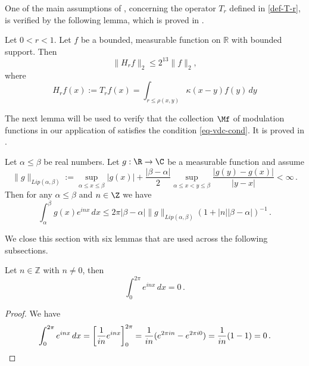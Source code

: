 One of the main assumptions of , concerning the operator $T_r$ defined in \eqref{def-T-r}, is verified by the following lemma, which is proved in .
\begin{lemma}
    \label{Hilbert-strong-2-2}
    \leanok
    Let $0<r<1$. Let $f$ be a bounded, measurable function on $\mathbb{R}$ with bounded support. Then
    \begin{equation}
        \label{eq-Hr-L2-bound}
        \|H_rf\|_{2}\leq 2^{13} \|f\|_2,
    \end{equation}
    where
    \begin{equation}
        \label{def-H-r}
        H_r f(x) := T_r f(x) = \int_{r\le\rho(x,y)} \kappa(x-y) f(y) \, dy
    \end{equation}
\end{lemma}

The next lemma will be used to verify that the collection $\Mf$ of modulation functions in our application of  satisfies the condition \eqref{eq-vdc-cond}.
It is proved in .

\begin{lemma}
\label{van-der-Corput}
\leanok
{}
    Let $\alpha\le\beta$ be real numbers. Let $g:\R\to \C$ be a measurable function and assume
    \begin{equation}
        \|g\|_{Lip(\alpha,\beta)}:=\sup_{\alpha\le x\le \beta}|g(x)|+\frac{|\beta-\alpha|}{2}
        \sup_{\alpha\le x<y\le \beta} \frac {|g(y)-g(x)|}{|y-x|}<\infty\, .
    \end{equation}
    Then for any $\alpha \le \beta$ and $n\in\Z$ we have
    \begin{equation}
        \int _{\alpha}^{\beta} g(x) e^{inx}\, dx\le 2\pi |\beta-\alpha|\|g\|_{Lip(\alpha,\beta)}(1+|n||\beta-\alpha|)^{-1}\, .
    \end{equation}

\end{lemma}


We close this section with six lemmas that are used
across the following subsections.

\begin{lemma}
\label{mean-zero-oscillation}
\leanok
{}
Let $n\in \mathbb{Z}$ with $n\neq 0$, then
\begin{equation}
\int_0^{2\pi} e^{inx}\, dx=0\,.
\end{equation}
\end{lemma}
\begin{proof}
\leanok
We have
\begin{equation*}
\int_0^{2\pi} e^{inx}\, dx=\left[ \frac 1{in}e^{inx}\right]_0^{2\pi}=\frac 1{in}(e^{2\pi i n}-e^{2\pi i 0})=\frac 1{in}(1-1)=0\, . \qedhere
\end{equation*}

\end{proof}

